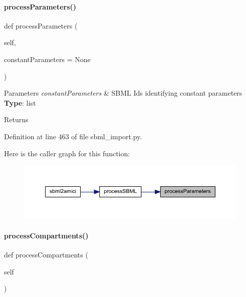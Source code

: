 \paragraph{\texorpdfstring{processParameters()}{processParameters()}}
{\footnotesize\ttfamily def process\+Parameters (\begin{DoxyParamCaption}\item[{}]{self,  }\item[{}]{constant\+Parameters = {\ttfamily None} }\end{DoxyParamCaption})}


\begin{DoxyParams}{Parameters}
{\em constant\+Parameters} & S\+B\+ML Ids identifying constant parameters ~\newline
{\bfseries{Type}}\+: list\\
\hline
\end{DoxyParams}
\begin{DoxyReturn}{Returns}

\end{DoxyReturn}


Definition at line 463 of file sbml\+\_\+import.\+py.

Here is the caller graph for this function\+:
\nopagebreak
\begin{figure}[H]
\begin{center}
\leavevmode
\includegraphics[width=350pt]{classamici_1_1sbml__import_1_1_sbml_importer_a26d072114efe1fec695cc4030c64e1ea_icgraph}
\end{center}
\end{figure}
\mbox{\label{classamici_1_1sbml__import_1_1_sbml_importer_a526afc71a857e7fdefb4754fc2f93882}} 
\paragraph{\texorpdfstring{processCompartments()}{processCompartments()}}
{\footnotesize\ttfamily def process\+Compartments (\begin{DoxyParamCaption}\item[{}]{self }\end{DoxyParamCaption})}

